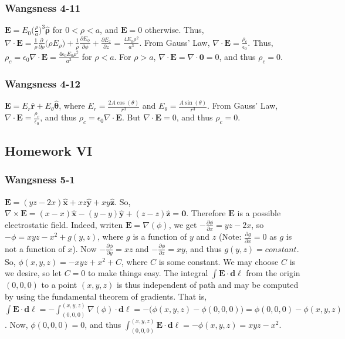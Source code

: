 \documentclass[oneside]{book}
\theoremstyle{definition}
\newcommand*\B[1]{\mathbf{#1}}
\newcommand*\Bh[1]{\mathbf{\hat{#1}}}
\begin{document}
\subsubsection{Wangsness 4-11}

$\B{E} = E_0 \big(\frac{\rho}{a}\big)^3 \Bh{\rho}$ for $0 < \rho < a$, and $\B{E} = 0$ otherwise. Thus, $\nabla \cdot \B{E} = \frac{1}{\rho} \frac{\partial}{\partial \rho}\big(\rho E_{\rho}\big) + \frac{1}{\rho} \frac{\partial E_{\phi}}{\partial \phi} + \frac{\partial E_z}{\partial z}$ = $\frac{4E_0 \rho^2}{a^3}$. From Gauss' Law, $\nabla \cdot \B{E} = \frac{\rho_c}{\epsilon_0}$. Thus, $\rho_c = \epsilon_0 \nabla \cdot \B{E} = \frac{4\epsilon_0 E_0 \rho^2}{a^3}$ for $\rho<a$. For $\rho>a$, $\nabla \cdot \B{E} = \nabla \cdot \B{0} = 0$, and thus $\rho_c = 0$.

\subsubsection{Wangsness 4-12}

$\B{E} = E_r \Bh{r}+E_{\theta} \Bh{\theta}$, where $E_r = \frac{2A\cos(\theta)}{r^3}$ and $E_{\theta} = \frac{A\sin(\theta)}{r^3}$. From Gauss' Law, $\nabla \cdot \B{E} = \frac{\rho_c}{\epsilon_0}$, and thus $\rho_c = \epsilon_0 \nabla \cdot \B{E}$. But $\nabla \cdot \B{E} = 0$, and thus $\rho_c = 0$.


\subsection*{Homework VI}

\subsubsection{Wangsness 5-1}

$\B{E} = (yz-2x)\Bh{x}+xz\Bh{y}+xy\Bh{z}$. So, $\nabla \times \B{E} = (x-x)\Bh{x}-(y-y)\Bh{y}+(z-z)\Bh{z} = \B{0}$. Therefore $\B{E}$ is a possible electrostatic field. Indeed, writen $\B{E} = \nabla(\phi)$, we get $-\frac{\partial \phi}{\partial x} = yz-2x$, so $-\phi = xyz - x^2 + g(y,z)$, where $g$ is a function of $y$ and $z$ (Note: $\frac{\partial g}{\partial x} = 0$ as $g$ is not a function of $x$). Now $-\frac{\partial \phi}{\partial y} = xz$ and $-\frac{\partial \phi}{\partial z} = xy$, and thus $g(y,z) = constant$. So, $\phi(x,y,z) = -xyz+x^2 + C$, where $C$ is some constant. We may choose $C$ is we desire, so let $C=0$ to make things easy. The integral $\int \B{E}\cdot \B{d\ell}$ from the origin $(0,0,0)$ to a point $(x,y,z)$ is thus independent of path and may be computed by using the fundamental theorem of gradients. That is, $\int \B{E}\cdot \B{d\ell} = -\int _{(0,0,0)}^{(x,y,z)} \nabla(\phi)\cdot \B{d\ell} = -\big(\phi(x,y,z) -\phi(0,0,0)\big) = \phi(0,0,0)-\phi(x,y,z)$. Now, $\phi(0,0,0)= 0$, and thus $\int_{(0,0,0)}^{(x,y,z)}\B{E}\cdot \B{d\ell} = -\phi(x,y,z) = xyz-x^2$. 
\end{document}
